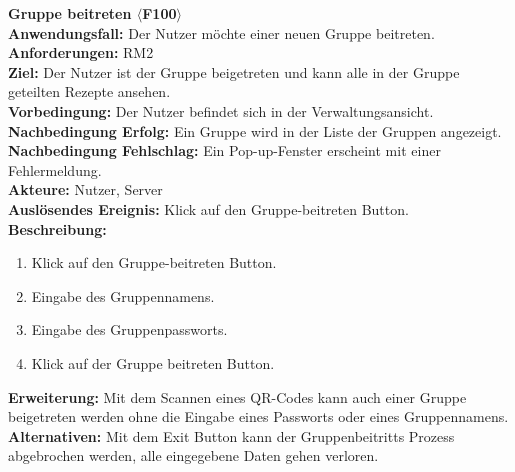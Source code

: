 \documentclass[parskip=full]{scrartcl}
\begin{document}
\textbf{Gruppe beitreten $\langle$F100$\rangle$}\\
\textbf{Anwendungsfall:} Der Nutzer möchte einer neuen Gruppe beitreten.\\
\textbf{Anforderungen:} RM2 \\
\textbf{Ziel:} Der Nutzer ist der Gruppe beigetreten und kann alle in der Gruppe geteilten Rezepte ansehen.\\
\textbf{Vorbedingung:} Der Nutzer befindet sich in der Verwaltungsansicht.\\
\textbf{Nachbedingung Erfolg:} Ein Gruppe wird in der Liste der Gruppen angezeigt.\\
\textbf{Nachbedingung Fehlschlag:} Ein Pop-up-Fenster erscheint mit einer Fehlermeldung.\\
\textbf{Akteure:} Nutzer, Server\\
\textbf{Auslösendes Ereignis:} Klick auf den Gruppe-beitreten Button.\\
\textbf{Beschreibung:}\\
\begin{enumerate}
    \item Klick auf den Gruppe-beitreten Button.
    \item Eingabe des Gruppennamens.
    \item Eingabe des Gruppenpassworts.
    \item Klick auf der Gruppe beitreten Button.
\end{enumerate}
\textbf{Erweiterung:} Mit dem Scannen eines QR-Codes kann auch einer Gruppe beigetreten werden ohne die Eingabe eines Passworts oder eines Gruppennamens.\\
\textbf{Alternativen:} Mit dem Exit Button kann der Gruppenbeitritts Prozess abgebrochen werden, alle eingegebene Daten gehen verloren.\\
\newpage
\end{document}
